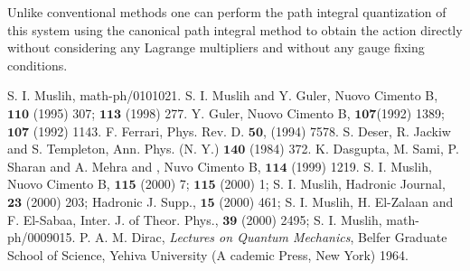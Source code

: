 \documentclass[a4paper,12pt]{article}
\begin{document}
Unlike conventional methods one can  perform the path integral
quantization of this system using the canonical path integral
method \cite{sm3}to obtain the action directly without
 considering any Lagrange multipliers and without any gauge fixing conditions.
\begin{thebibliography}{}%
 S. I. Muslih, math-ph/0101021.
S. I. Muslih and Y. Guler, Nuovo Cimento B, $\mathbf{110}$
(1995) 307; $\mathbf{113}$ (1998) 277.
Y. Guler, Nuovo Cimento B, $\mathbf{107 }$(1992) 1389;
 $\mathbf{107}$ (1992) 1143.
 F. Ferrari, Phys. Rev. D. $\mathbf{50}$, (1994) 7578.
 S. Deser, R. Jackiw and S. Templeton, Ann. Phys. (N.
Y.) $\mathbf{140}$ (1984) 372.
K. Dasgupta, M. Sami, P. Sharan and A. Mehra and ,
Nuvo Cimento B, $\mathbf{114}$ (1999) 1219.
S. I. Muslih, Nuovo Cimento B, $\mathbf{115}$ (2000) 7;
$\mathbf{115}$ (2000) 1; S. I. Muslih, Hadronic Journal,
$\mathbf{23}$ (2000) 203; Hadronic J. Supp.,  $\mathbf{15}$ (2000)
461; S. I. Muslih, H. El-Zalaan and F. El-Sabaa, Inter. J. of
Theor. Phys., $\mathbf{39}$ (2000) 2495; S. I. Muslih,
math-ph/0009015.
P. A. M. Dirac, {\it Lectures on Quantum Mechanics}, Belfer
 Graduate School of Science, Yehiva University (A cademic Press,
 New York) 1964.
\end{thebibliography}
\end{document}
